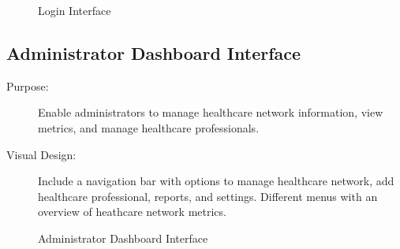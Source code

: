 \documentclass[12pt, titlepage]{article}
\begin{document}
\begin{figure}[h!]
    \centering
    \caption{Login Interface}
    \label{fig:admin-interface}
\end{figure}

\newpage{}


\subsection{Administrator Dashboard Interface}
\begin{description}
    \item[Purpose:]Enable administrators to manage healthcare network information, view metrics, and manage healthcare professionals.
   
    \item[Visual Design:]Include a navigation bar with options to manage healthcare network, add healthcare professional, reports, and settings. Different menus with an overview of heathcare network metrics.
\end{description}

\begin{figure}[h!]
    \centering
    \caption{Administrator Dashboard Interface}
    \label{fig:admin-interface}
\end{figure}
\end{document}
